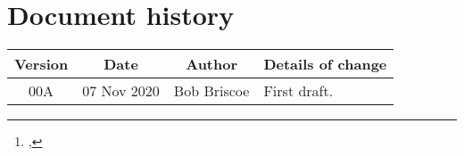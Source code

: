 \documentclass[a4paper,twoside,twocolumn]{article}
\title{\metatitle}%
\author{\metaauthori%
\thanks{\metamaili, %
\metaaddress}%
}
\date{\metadate}%
\newcommand*{\metaversion}{00A}
\newcommand*{\metadate}{07 Nov 2020}
\begin{document}
%


\maketitle%
\thispagestyle{first}


{}

\newpage
{\footnotesize%
}


\onecolumn%
\section*{Document history}

\begin{tabular}{|c|c|c|p{3.5in}|}
 \hline
Version &Date &Author &Details of change \\
 \hline\hline
\metaversion &\metadate     &Bob Briscoe &First draft.\\\hline%
\hline%
\end{tabular}
\end{document}

